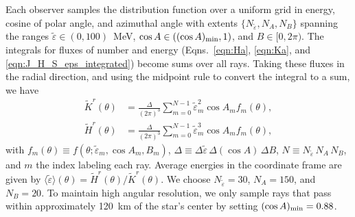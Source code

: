\documentclass[aps,floatfix,prd,superscriptaddress,twocolumn]{revtex4-1}
\begin{document}
Each observer samples the distribution function over a uniform grid
in energy, cosine of polar angle, and azimuthal angle with extents
$\{N_{\tilde{\varepsilon}},N_A, N_B\}$ spanning the ranges
$\tilde{\varepsilon}\in(0,100)$~MeV,
$\cos A\in\left((\cos A)_{\rm min}, 1\right)$, and
$B\in[0,2\pi)$.
The integrals for fluxes of number and energy
(Eqns.~\ref{eqn:Ha}, \ref{eqn:Ka}, and \ref{eqn:J_H_S_eps_integrated})
become sums over all rays.
Taking these fluxes in the radial direction,
and using the midpoint rule to convert the integral to a sum, we have
\begin{align}
  \label{eqn:Kr_minkowski}
  \tilde{K}^r(\theta) &= \frac{\Delta}{(2\pi)^3}
  \sum\limits_{m=0}^{N-1}
  \tilde{\varepsilon}_m^2 \cos A_m f_m(\theta),\\
  \label{eqn:Hr_minkowski}
  \tilde{H}^r(\theta) &= \frac{\Delta}{(2\pi)^3}
  \sum\limits_{m=0}^{N-1}
  \tilde{\varepsilon}_m^3 \cos A_m f_m(\theta),
\end{align}
with $f_m(\theta) \equiv f(\theta;\tilde{\varepsilon}_m,\cos A_m, B_m)$,
$\Delta \equiv \Delta\tilde{\varepsilon}\, \Delta(\cos A)\, \Delta B$,
$N \equiv N_{\tilde{\varepsilon}}\, N_A\, N_B$,
and $m$ the index labeling each ray.
Average energies in the coordinate frame are given by
$\langle\tilde{\varepsilon}\rangle(\theta)=\tilde{H}^r(\theta)/\tilde{K}^r(\theta)$.
We choose $N_{\tilde{\varepsilon}}=30$, $N_A=150$, and $N_B=20$.
To maintain high angular resolution, we only sample rays that pass within
approximately 120~km of the star's center by setting $(\cos A)_{\rm min}=0.88$.
\end{document}
